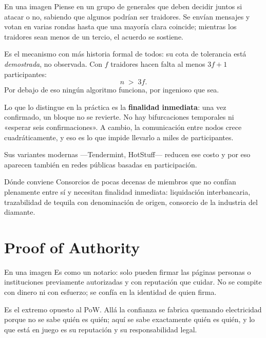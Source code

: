\documentclass[11pt,a4paper]{article}
\theoremstyle{definition}
\theoremstyle{plain}
\theoremstyle{remark}
\begin{document}
\begin{nota}{En una imagen}
Piense en un grupo de generales que deben decidir juntos si atacar o no, sabiendo
que algunos podrían ser traidores. Se envían mensajes y votan en varias rondas
hasta que una mayoría clara coincide; mientras los traidores sean menos de un
tercio, el acuerdo se sostiene.
\end{nota}

Es el mecanismo con más historia formal de todos: su cota de tolerancia está
\emph{demostrada}, no observada. Con $f$ traidores hacen falta al menos
$3f + 1$ participantes:
\[
  n \;>\; 3f.
\]
Por debajo de eso ningún algoritmo funciona, por ingenioso que sea.

Lo que lo distingue en la práctica es la \textbf{finalidad inmediata}: una vez
confirmado, un bloque no se revierte. No hay bifurcaciones temporales ni «esperar
seis confirmaciones». A cambio, la comunicación entre nodos crece
cuadráticamente, y eso es lo que impide llevarlo a miles de participantes.

Sus variantes modernas —Tendermint, HotStuff— reducen ese costo y por eso
aparecen también en redes públicas basadas en participación.

\begin{caso}{Dónde conviene}
Consorcios de pocas decenas de miembros que no confían plenamente entre sí y
necesitan finalidad inmediata: liquidación interbancaria, trazabilidad de tequila
con denominación de origen, consorcio de la industria del diamante.
\end{caso}

\section{Proof of Authority}\label{sec:poa}

\begin{nota}{En una imagen}
Es como un notario: solo pueden firmar las páginas personas o instituciones
previamente autorizadas y con reputación que cuidar. No se compite con dinero ni
con esfuerzo; se confía en la identidad de quien firma.
\end{nota}

Es el extremo opuesto al PoW. Allá la confianza se fabrica quemando electricidad
porque no se sabe quién es quién; aquí se sabe exactamente quién es quién, y lo
que está en juego es su reputación y su responsabilidad legal.
\end{document}
